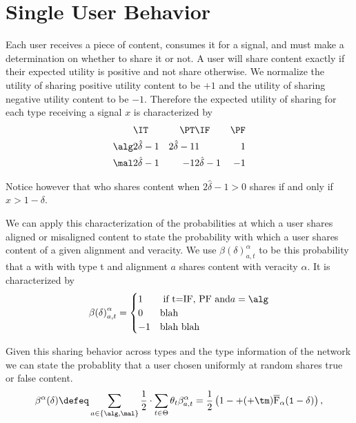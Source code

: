 \section{Single User Behavior}

Each user receives a piece of content, consumes it for a signal, and must make a determination on whether to share it or not. A user will share content exactly if their expected utility is positive and not share otherwise.  We normalize the utility of sharing positive utility content to be $+1$ and the utility of sharing negative utility content to be $-1$. Therefore the expected utility of sharing for each type receiving a signal $x$ is characterized by 
\begin{align*}
   &  \IT & \PT & \IF & \PF \\
  \alg & 2\hat{\delta} -1 & 2\hat{\delta} -1 & 1 & 1 \\
  \mal & 2\hat{\delta} -1 & -1 & 2\hat{\delta} -1 & -1 
\end{align*}

Notice however that who shares content when $2\hat{\delta} -1 > 0$ shares if and only if $x > 1 - \delta$. 

We can apply this characterization of the probabilities at which a user shares aligned or misaligned content to state the probability with which a user shares content of a given alignment and veracity. We use ${\beta(\delta)}^\alpha_{a,t}$ to be this probability that a with with type t and alignment $a$ shares content with veracity $\alpha$.  It is characterized by 
\begin{equation}
    {\beta(\delta)}^\alpha_{a,t} = \begin{cases} 1  & \text{ if t=IF, PF and} a=\alg \\
    0 & \text{blah } \\ 
    -1 & \text{blah blah} \end{cases}
\end{equation}


Given this sharing behavior across types and the type information of the network we can state the probablity that a user chosen uniformly at random shares true or false content. 
\begin{equation}\label{eq:share-probabilities}
\beta^\alpha(\delta) \defeq \sum_{a \in \{\alg, \mal\}} \frac{1}{2} \cdot \sum_{t \in \Theta}  \theta_t  \beta^\alpha_{a, t} = \frac{1}{2} \left(1 - \tt + (\tt+\tm) \overline{\mathrm{F}}_\alpha(1-\delta)  \right), 
\end{equation}

